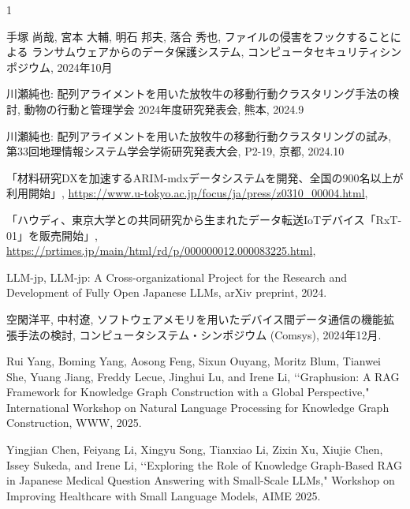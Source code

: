 \begin{発表}{1}

手塚 尚哉, 宮本 大輔, 明石 邦夫, 落合 秀也, ファイルの侵害をフックすることによる ランサムウェアからのデータ保護システム, コンピュータセキュリティシンポジウム, 2024年10月

川瀬純也: 配列アライメントを用いた放牧牛の移動行動クラスタリング手法の検討, 動物の行動と管理学会 2024年度研究発表会, 熊本, 2024.9

川瀬純也: 配列アライメントを用いた放牧牛の移動行動クラスタリングの試み, 第33回地理情報システム学会学術研究発表大会, P2-19, 京都, 2024.10

「材料研究DXを加速するARIM-mdxデータシステムを開発、全国の900名以上が利用開始」,
\url{https://www.u-tokyo.ac.jp/focus/ja/press/z0310_00004.html},

「ハウディ、東京大学との共同研究から生まれたデータ転送IoTデバイス「RxT-01」を販売開始」,
\url{https://prtimes.jp/main/html/rd/p/000000012.000083225.html},

LLM-jp, LLM-jp: A Cross-organizational Project for the Research and Development of Fully Open Japanese LLMs, arXiv preprint, 2024.

空閑洋平, 中村遼, ソフトウェアメモリを用いたデバイス間データ通信の機能拡張手法の検討, コンピュータシステム・シンポジウム (Comsys), 2024年12月.

Rui Yang, Boming Yang, Aosong Feng, Sixun Ouyang, Moritz Blum, Tianwei She, Yuang Jiang, Freddy Lecue, Jinghui Lu, and Irene Li, \lq\lq Graphusion: A RAG Framework for Knowledge Graph Construction with a Global Perspective,"
International Workshop on Natural Language Processing for Knowledge Graph Construction, WWW, 2025. 

Yingjian Chen, Feiyang Li, Xingyu Song, Tianxiao Li, Zixin Xu, Xiujie Chen, Issey Sukeda, and Irene Li,
\lq\lq Exploring the Role of Knowledge Graph-Based RAG in Japanese Medical Question Answering with Small-Scale LLMs," Workshop on Improving Healthcare with Small Language Models, AIME 2025. 

\end{発表}




